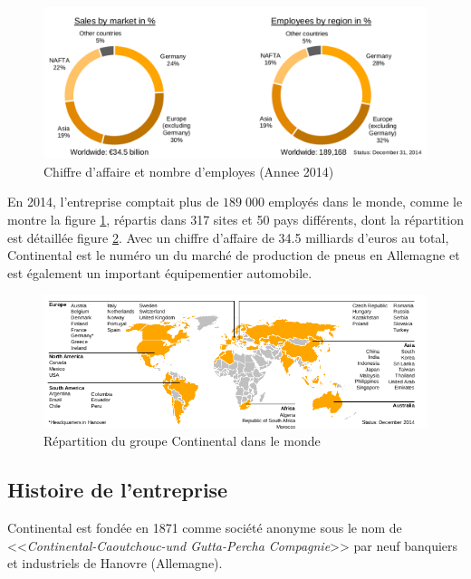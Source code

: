 \begin{figure}[H]
	\centering
	\includegraphics[width=17cm]{contents/images/caConti.png}
	\caption[Chiffre d'affaire et nombre d'employes (Annee 2014)]{Chiffre d'affaire et nombre d'employes (Annee 2014)\footnotemark{}}
	\label{fig:caConti}
\end{figure}
En 2014, l'entreprise comptait plus de $189\;000$ employés dans le monde, comme le montre la figure \ref{fig:caConti}, répartis dans 317 sites et 50 pays différents, dont la répartition est détaillée figure \ref{fig:repartitionConti}. Avec un chiffre d'affaire de 34.5 milliards d'euros au total, Continental est le numéro un du marché de production de pneus en Allemagne et est également un important équipementier automobile.
\begin{figure}[H]
	\centering
	\includegraphics[width=16cm]{contents/images/repartitionConti.png}
	\caption{Répartition du groupe Continental dans le monde}
	\label{fig:repartitionConti}
\end{figure}		 

\subsection{Histoire de l'entreprise}
Continental est fondée en 1871 comme société anonyme sous le nom de <<\textit{Continental-Caoutchouc-und Gutta-Percha Compagnie}>> par neuf banquiers et industriels de Hanovre (Allemagne).

